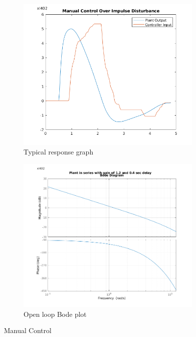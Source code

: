\documentclass{article}
\begin{document}
\begin{figure}
\centering
\begin{subfigure}{.5\textwidth}
  \centering
  \includegraphics[width=1.1\linewidth]{1_manual_control_input_disturbance.png}
  \caption{Typical response graph}
  \label{fig:manual_control}
\end{subfigure}%
\begin{subfigure}{.5\textwidth}
  \centering
  \includegraphics[width=1.1\linewidth]{1_1_Plant_Bode_Manual_Control.png}
  \caption{Open loop Bode plot}
  \label{fig:manual_bode}
\end{subfigure}
\caption{Manual Control}
\label{fig:test}
\end{figure}
\end{document}
